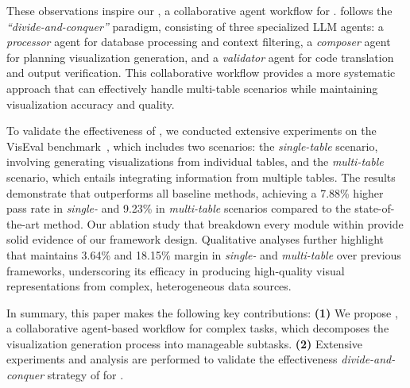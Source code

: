 These observations inspire our \system, a collaborative agent workflow for \nlvis.
\system follows the \textit{``divide-and-conquer''} paradigm, consisting of three specialized LLM agents: a \textit{processor} agent for database processing and context filtering, a \textit{composer} agent for planning visualization generation, and a \textit{validator} agent for code translation and output verification. 
This collaborative workflow provides a more systematic approach that can effectively handle multi-table scenarios while maintaining visualization accuracy and quality.

To validate the effectiveness of \system, we conducted extensive experiments on the VisEval benchmark~\cite{viseval}, which includes two scenarios: the \textit{single-table} scenario, involving generating visualizations from individual tables, and the \textit{multi-table} scenario, which entails integrating information from multiple tables. The results demonstrate that \system outperforms all baseline methods, achieving a 7.88\% higher pass rate in \textit{single-} and 9.23\% in \textit{multi-table} scenarios compared to the state-of-the-art method. Our ablation study that breakdown every module within \system provide solid evidence of our framework design. Qualitative analyses further highlight that \system maintains 3.64\% and 18.15\% margin in \textit{single-} and \textit{multi-table} over previous frameworks, underscoring its efficacy in producing high-quality visual representations from complex, heterogeneous data sources.

In summary, this paper makes the following key contributions:
    \textbf{(1)} We propose \textbf{\system}, a collaborative agent-based workflow for complex \nlvis tasks, which decomposes the visualization generation process into manageable subtasks.
    \textbf{(2)} Extensive experiments and analysis are performed to validate the effectiveness \textit{divide-and-conquer} strategy of \system for \nlvis.



